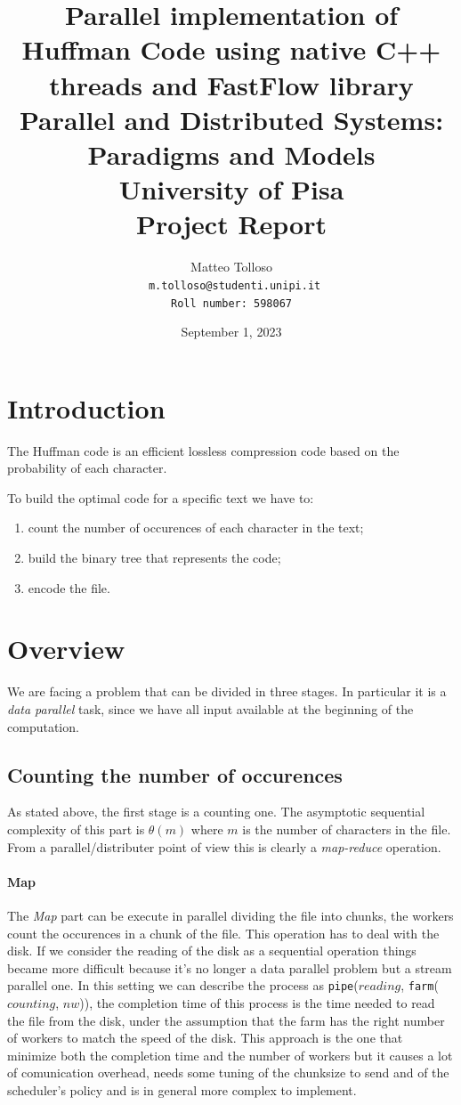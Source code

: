 \documentclass[12pt, letterpaper]{article}
\title{\vspace{2cm}\textbf{Parallel implementation of Huffman Code using native C++ threads and FastFlow library} \\
        \bigskip
        \Large{
            \medskip
            Parallel and Distributed Systems: Paradigms and Models \\
            \medskip
            University of Pisa \\
            \medskip
            Project Report\\
            \medskip
        }
}
\author{
  {Matteo Tolloso}\\
  \texttt{ \scriptsize{m.tolloso@studenti.unipi.it}}\\
  \texttt{\scriptsize{Roll number: 598067}} \\
}
\begin{document}
\nocite{*}
\date{September 1, 2023}
\maketitle

\newpage

\section{Introduction}
The Huffman code is an efficient lossless compression code based on the probability of each character.

To build the optimal code for a specific text we have to:
\begin{enumerate}
    \item count the number of occurences of each character in the text;
    \item build the binary tree that represents the code;
    \item encode the file.
\end{enumerate}

\section{Overview}

We are facing a problem that can be divided in three stages. In particular it is a \textit{data parallel} task, since we have all input available at the beginning of the computation.

\subsection{Counting the number of occurences}
As stated above, the first stage is a counting one. The asymptotic sequential complexity of this part is $\theta(m)$ where $m$ is the number of characters in the file.
From a parallel/distributer point of view this is clearly a \textit{map-reduce} operation.

\paragraph*{Map}
The \textit{Map} part can be execute in parallel dividing the file into chunks, the workers count the occurences in a chunk of the file. 
This operation has to deal with the disk. If we consider the reading of the disk as a sequential operation things became more difficult because it's no longer a data parallel problem but a stream parallel one. In this setting we can describe the process as \texttt{pipe}($reading$, \texttt{farm}($counting$, $nw$)), the completion time of this process is the time needed to read the file from the disk, under the assumption that the farm has the right number of workers to match the speed of the disk. This approach is the one that minimize both the completion time and the number of workers but it causes a lot of comunication overhead, needs some tuning of the chunksize to send and of the scheduler's policy and is in general more complex to implement.
\end{document}
